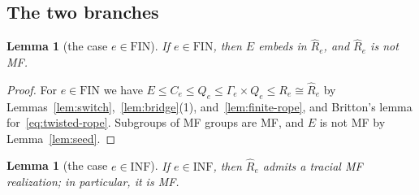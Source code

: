 \documentclass[11pt]{amsart}
\newcommand{\leanverified}[2]{\ignorespaces}
\newtheorem{lemma}[theorem]{Lemma}
\theoremstyle{remark}
\theoremstyle{plain}
\begin{document}
\subsection*{The two branches}

\begin{lemma}[the case $e\in\mathrm{FIN}$]\label{lem:negative-branch}
If $e\in\mathrm{FIN}$, then $E$ embeds in $\widehat R_e$, and
$\widehat R_e$ is not MF\@.
\end{lemma}

\begin{proof}
For $e\in\mathrm{FIN}$ we have $E\le C_e\le Q_e\le\Gamma_e\times Q_e\le R_e\cong\widehat R_e$
by Lemmas~\ref{lem:switch},~\ref{lem:bridge}(1), and~\ref{lem:finite-rope}, and
Britton's lemma for~\eqref{eq:twisted-rope}.  Subgroups of MF groups are
MF, and $E$ is not MF by Lemma~\ref{lem:seed}.
\leanverified{Manuscript/OneSidedMFRadical/ComputabilityConstructionClosure}{GroupApproximation.Manuscript.OneSidedMFRadical.ComputabilityConstruction.manuscriptPrintedNonMFEmbeddingObstruction}
\end{proof}

\begin{lemma}[the case $e\in\mathrm{INF}$]\label{lem:positive-branch}
If $e\in\mathrm{INF}$, then $\widehat R_e$ admits a tracial MF
realization; in particular, it is MF\@.
\end{lemma}
\end{document}
